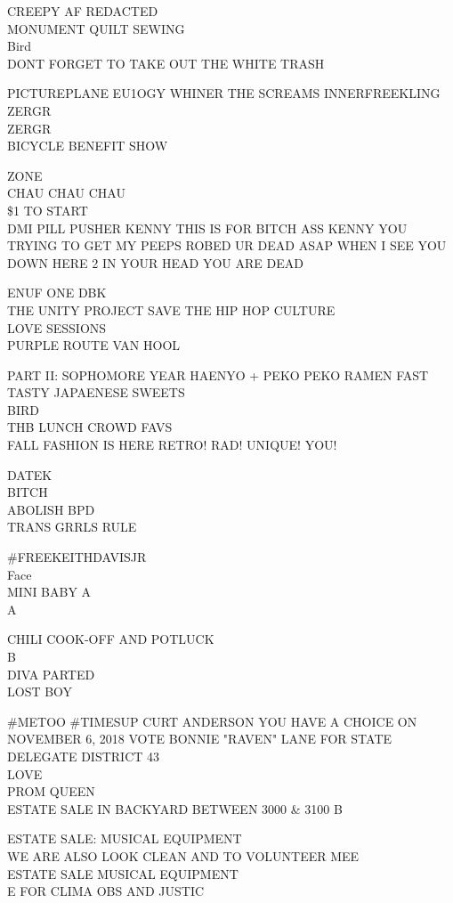 \documentclass[10pt,letterpaper]{article}
\begin{document}
CREEPY AF REDACTED\\
MONUMENT QUILT SEWING\\
Bird\\
DONT FORGET TO TAKE OUT THE WHITE TRASH

PICTUREPLANE EU1OGY WHINER THE SCREAMS INNERFREEKLING\\
ZERGR\\
ZERGR\\
BICYCLE BENEFIT SHOW

ZONE\\
CHAU CHAU CHAU\\
\$1 TO START\\
DMI PILL PUSHER KENNY THIS IS FOR BITCH ASS KENNY YOU TRYING TO GET MY PEEPS ROBED UR DEAD ASAP WHEN I SEE YOU DOWN HERE 2 IN YOUR HEAD YOU ARE DEAD

ENUF ONE DBK\\
THE UNITY PROJECT SAVE THE HIP HOP CULTURE\\
LOVE SESSIONS\\
PURPLE ROUTE VAN HOOL

PART II: SOPHOMORE YEAR HAENYO + PEKO PEKO RAMEN FAST TASTY JAPAENESE SWEETS\\
BIRD\\
THB LUNCH CROWD FAVS\\
FALL FASHION IS HERE RETRO! RAD! UNIQUE! YOU!

DATEK\\
BITCH\\
ABOLISH BPD\\
TRANS GRRLS RULE

\#FREEKEITHDAVISJR\\
Face\\
MINI BABY A\\
A

CHILI COOK{-}OFF AND POTLUCK\\
B\\
DIVA PARTED\\
LOST BOY

\#METOO \#TIMESUP CURT ANDERSON YOU HAVE A CHOICE ON NOVEMBER 6, 2018 VOTE BONNIE "RAVEN" LANE FOR STATE DELEGATE DISTRICT 43\\
LOVE\\
PROM QUEEN\\
ESTATE SALE IN BACKYARD BETWEEN 3000 \& 3100 B

ESTATE SALE: MUSICAL EQUIPMENT\\
WE ARE ALSO LOOK CLEAN AND TO VOLUNTEER MEE\\
ESTATE SALE MUSICAL EQUIPMENT\\
E FOR CLIMA OBS AND JUSTIC
\end{document}
